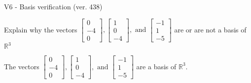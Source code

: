 \begin{exercise}
  \begin{exerciseTitle}V6 - Basis verification (ver. 438)\end{exerciseTitle}
  \begin{exerciseStatement}
    Explain why the vectors \(\left[\begin{array}{r}
0 \\
-4 \\
0
\end{array}\right] , \left[\begin{array}{r}
1 \\
0 \\
-4
\end{array}\right] , \text{ and } \left[\begin{array}{r}
-1 \\
1 \\
-5
\end{array}\right]\) are or are not a basis of \(\mathbb{R}^3\)	


  \end{exerciseStatement}
  \begin{exerciseAnswer}
   The vectors \(\left[\begin{array}{r}
0 \\
-4 \\
0
\end{array}\right] , \left[\begin{array}{r}
1 \\
0 \\
-4
\end{array}\right] , \text{ and } \left[\begin{array}{r}
-1 \\
1 \\
-5
\end{array}\right]\) 
  	 are  a basis of \(\mathbb{R}^3\).
  


  \end{exerciseAnswer}
\end{exercise}